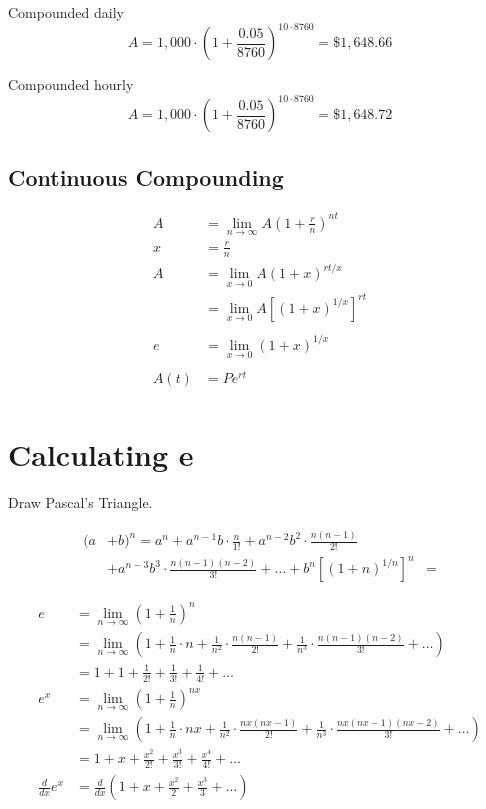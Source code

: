 \documentclass[letterpaper, landscape]{exam}
\begin{document}
  Compounded daily
  \[
    A = 1,000 \cdot \left( 1 + \frac{0.05}{8760} \right)^{10 \cdot 8760} = \$1,648.66
  \]

  Compounded hourly
  \[
    A = 1,000 \cdot \left( 1 + \frac{0.05}{8760} \right)^{10 \cdot 8760} = \$1,648.72
  \]

  \subsection{Continuous Compounding} %
  
  \begin{align*}
    A    & = \lim_{n \to \infty} A \left( 1 + \frac{r}{n} \right)^{nt}
    \\
    x    & = \frac{r}{n} \
    \\
    A    & = \lim_{x \to 0} A \left( 1 + x \right)^{rt/x} \\
         & = \lim_{x \to 0} A \left[ \left( 1 + x \right)^{1/x} \right]^{rt} \\
    \\
    e    & = \lim_{x \to 0} \left( 1 + x \right)^{1/x} \\
    \\
    A(t) & = P e^{rt} \\
  \end{align*}


  \section{Calculating e} %
  
  Draw Pascal's Triangle.

  \begin{align*}
    (a & + b)^n = a^n + a^{n - 1} b \cdot \frac{n}{1!} + a^{n - 2} b^2 \cdot \frac{n(n - 1)}{2!} \\
       &+ a^{n - 3} b^3 \cdot \frac{n(n - 1)(n - 2)}{3!} + \ldots + b^n
    \left[ (1 + n)^{1/n} \right]^n &= 
  \end{align*}

  \begin{align*}
    e &= \lim_{n \to \infty} \left( 1 + \frac{1}{n} \right)^n \\
      & = \lim_{n \to \infty} \left( 1 + \frac{1}{n} \cdot n + \frac{1}{n^2} \cdot \frac{n(n - 1)}{2!} 
        + \frac{1}{n^3} \cdot \frac{n(n - 1)(n - 2)}{3!} + \ldots \right) \\
      & = 1 + 1 + \frac{1}{2!} + \frac{1}{3!} + \frac{1}{4!} + \ldots
    \\
    e^x &= \lim_{n \to \infty} \left( 1 + \frac{1}{n} \right)^{nx} \\
      & = \lim_{n \to \infty} \left( 1 + \frac{1}{n} \cdot nx + \frac{1}{n^2} \cdot \frac{nx(nx - 1)}{2!} 
        + \frac{1}{n^3} \cdot \frac{nx(nx - 1)(nx - 2)}{3!} + \ldots \right) \\
      & = 1 + x + \frac{x^2}{2!} + \frac{x^3}{3!} + \frac{x^4}{4!} + \ldots
    \\
    \frac{d}{dx} e^x &= \frac{d}{dx} \left( 1 + x + \frac{x^2}{2} + \frac{x^3}{3} + \ldots  \right)
  \end{align*}
\end{document}
